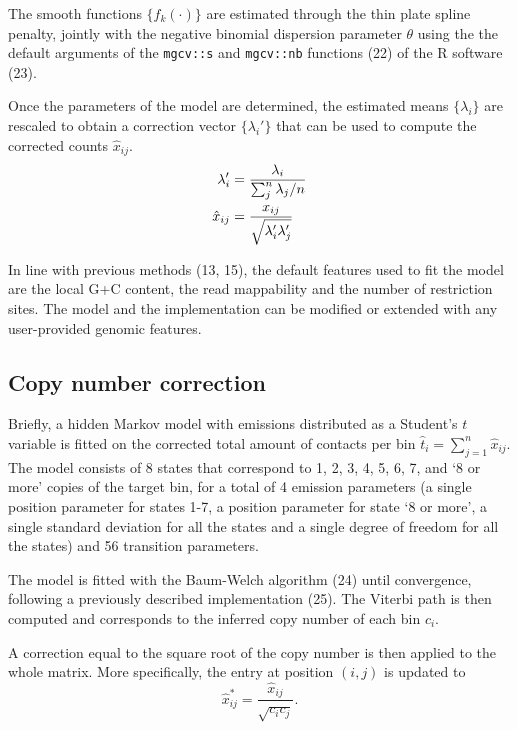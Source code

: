 \documentclass[a4,center,fleqn]{NAR}
\providecommand{\DIFadd}[1]{{\protect\color{red}#1}} %
\providecommand{\DIFdel}[1]{{\protect}}                      %
\providecommand{\DIFaddbegin}{} %
\providecommand{\DIFaddend}{} %
\providecommand{\DIFdelbegin}{} %
\providecommand{\DIFdelend}{} %
\begin{document}
The smooth functions $\{f_k(\cdot)\}$ are estimated through the thin plate
spline penalty, jointly with the negative binomial dispersion parameter
$\theta$ using the the default arguments of the \texttt{mgcv::s} and
\texttt{mgcv::nb} functions (\DIFdelbegin \DIFdel{20}\DIFdelend \DIFaddbegin \DIFadd{22}\DIFaddend ) of the R software
(\DIFdelbegin \DIFdel{21}\DIFdelend \DIFaddbegin \DIFadd{23}\DIFaddend ).


Once the parameters of the model are determined, the estimated means
$\{\lambda_i\}$ are rescaled to obtain a correction vector
$\{\lambda_i'\}$ that can be used to compute the corrected counts
$\hat{x}_{ij}$.
\begin{align}
\notag
\lambda_i' &= \frac{\lambda_i}{\sum_j^n{\lambda_j}/n} \\
\label{eq:xhat}
\hat{x}_{ij} &= \frac{x_{ij}}{\sqrt{\lambda_i'\lambda_j'}}
\end{align}

In line with previous methods
(13, 15), the default features used to
fit the model are the local G+C content, the read mappability and the
number of restriction sites. The model and the implementation can be
modified or extended with any user-provided genomic features.

\subsection{Copy number correction}

Briefly, a hidden Markov model with emissions distributed as a Student's
$t$ variable is fitted on the corrected total amount of contacts per bin
$\hat{t}_i = \sum_{j=1}^n{\hat{x}_{ij}}$. The model consists of 8
states that correspond to 1, 2, 3, 4, 5, 6, 7, and `8 or more' copies of
the target bin, for a total of 4 emission parameters (a single position
parameter for states 1-7, a position parameter for state `8 or more', a
single standard deviation for all the states and a single degree of
freedom for all the states) and 56 transition parameters. 

The model is fitted with the Baum-Welch algorithm (\DIFdelbegin \DIFdel{22}\DIFdelend \DIFaddbegin \DIFadd{24}\DIFaddend ) until
convergence, following a previously described implementation
(\DIFdelbegin \DIFdel{23}\DIFdelend \DIFaddbegin \DIFadd{25}\DIFaddend ).  The Viterbi path is then computed and
corresponds to the inferred copy number of each bin $c_i$.

A correction equal to the square root of the copy number is then applied
to the whole matrix. More specifically, the entry at position $(i,j)$ is
updated to
\begin{equation}
\label{eq:cnvnorm}
\hat{x}_{ij}^* = \frac{\hat{x}_{ij}}{\sqrt{c_ic_j}}.
\end{equation}
\end{document}
